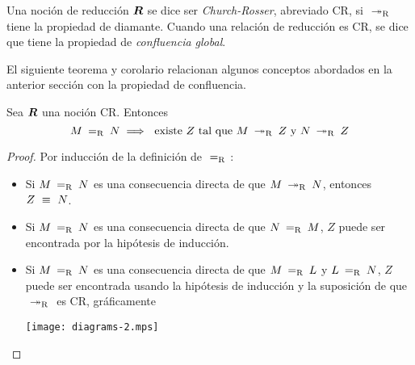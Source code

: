 \begin{defn}
  Una noción de reducción \( \boldsymbol{R} \) se dice ser \emph{Church-Rosser}, abreviado CR, si \( \ \operatorname{\twoheadrightarrow_{R}}\  \) tiene la propiedad de diamante. Cuando una relación de reducción es CR, se dice que tiene la propiedad de \emph{confluencia global}.
\end{defn}

El siguiente teorema y corolario relacionan algunos conceptos abordados en la anterior sección con la propiedad de confluencia.

\begin{thm}
  Sea \( \boldsymbol{R} \) una noción CR. Entonces
  \[ M \ \operatorname{=_{R}}\  N \implies \text{ existe } Z \text{ tal que } M \ \operatorname{\twoheadrightarrow_{R}}\  Z \text{ y } N \ \operatorname{\twoheadrightarrow_{R}}\  Z \]
  \begin{proof}
    Por inducción de la definición de \( \ \operatorname{=_{R}}\  \):
    \begin{itemize}
    \item Si \( M \ \operatorname{=_{R}}\  N \) es una consecuencia directa de que \( M \ \operatorname{\twoheadrightarrow_{R}}\  N \), entonces \( Z \ \equiv\  N \).
    \item Si \( M \ \operatorname{=_{R}}\  N \) es una consecuencia directa de que \( N \ \operatorname{=_{R}}\  M \), \( Z \) puede ser encontrada por la hipótesis de inducción.
    \item Si \( M \ \operatorname{=_{R}}\  N \) es una consecuencia directa de que \( M \ \operatorname{=_{R}}\  L \) y \( L \ \operatorname{=_{R}}\  N \), \( Z \) puede ser encontrada usando la hipótesis de inducción y la suposición de que \( \ \operatorname{\twoheadrightarrow_{R}}\  \) es CR, gráficamente
      \begin{center}
        \texttt{[image: diagrams-2.mps]}
      \end{center}
    \end{itemize}
  \end{proof}
\end{thm}

